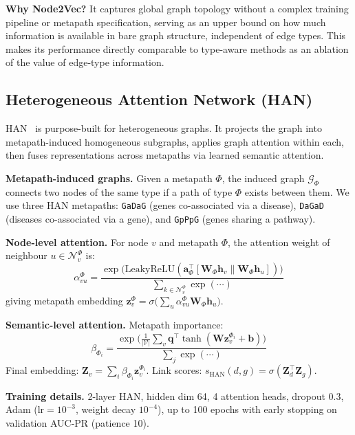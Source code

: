 \documentclass[10pt,a4paper,twocolumn]{article}
\newcommand{\Gcal}{\mathcal{G}}
\newcommand{\Vcal}{\mathcal{V}}
\begin{document}
\textbf{Why Node2Vec?} It captures global graph topology without a complex
training pipeline or metapath specification, serving as an upper bound on how
much information is available in bare graph structure, independent of edge types.
This makes its performance directly comparable to type-aware methods as an
ablation of the value of edge-type information.

\subsection{Heterogeneous Attention Network (HAN)}

HAN~\citep{wang2019han} is purpose-built for heterogeneous graphs. It projects
the graph into metapath-induced homogeneous subgraphs, applies graph attention
within each, then fuses representations across metapaths via learned semantic
attention.

\textbf{Metapath-induced graphs.} Given a metapath $\Phi$, the induced graph
$\Gcal_\Phi$ connects two nodes of the same type if a path of type $\Phi$
exists between them. We use three HAN metapaths: \texttt{GaDaG} (genes
co-associated via a disease), \texttt{DaGaD} (diseases co-associated via a
gene), and \texttt{GpPpG} (genes sharing a pathway).

\textbf{Node-level attention.} For node $v$ and metapath $\Phi$, the attention
weight of neighbour $u \in \mathcal{N}_v^\Phi$ is:
\begin{equation}
\alpha_{vu}^\Phi = \frac{
  \exp\!\bigl(\text{LeakyReLU}(\mathbf{a}_\Phi^\top[\mathbf{W}_\Phi\mathbf{h}_v \| \mathbf{W}_\Phi\mathbf{h}_u])\bigr)
}{
  \sum_{k\in\mathcal{N}_v^\Phi}\exp(\cdots)
}
\end{equation}
giving metapath embedding $\mathbf{z}_v^\Phi = \sigma\!\bigl(\sum_u \alpha_{vu}^\Phi \mathbf{W}_\Phi\mathbf{h}_u\bigr)$.

\textbf{Semantic-level attention.} Metapath importance:
\begin{equation}
\beta_{\Phi_i} = \frac{
  \exp\!\bigl(\tfrac{1}{|\Vcal|}\sum_v \mathbf{q}^\top\tanh(\mathbf{W}\mathbf{z}_v^{\Phi_i}+\mathbf{b})\bigr)
}{
  \sum_j\exp(\cdots)
}
\end{equation}
Final embedding: $\mathbf{Z}_v = \sum_i \beta_{\Phi_i}\mathbf{z}_v^{\Phi_i}$.
Link scores: $s_{\text{HAN}}(d,g) = \sigma(\mathbf{Z}_d^\top\mathbf{Z}_g)$.

\textbf{Training details.} 2-layer HAN, hidden dim 64, 4 attention heads,
dropout 0.3, Adam ($\text{lr}=10^{-3}$, weight decay $10^{-4}$), up to 100
epochs with early stopping on validation AUC-PR (patience 10).
\end{document}
